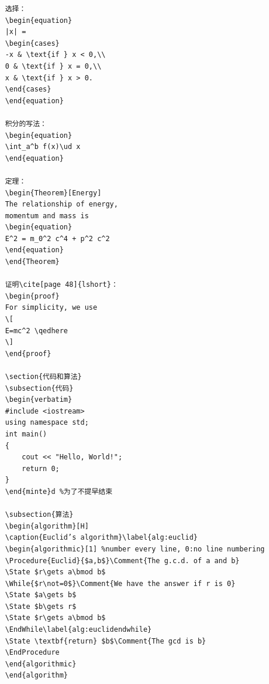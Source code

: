 \documentclass[a4paper]{article} %
\numberwithin{equation}{section} %
\newcommand{\ud}{\,\mathrm{d}}
\newtheorem{Theorem}{定理}
\begin{document}
\begin{verbatim}
    选择：
    \begin{equation}
    |x| =
    \begin{cases}
    -x & \text{if } x < 0,\\
    0 & \text{if } x = 0,\\
    x & \text{if } x > 0.
    \end{cases}
    \end{equation}
    
    积分的写法：
    \begin{equation}
    \int_a^b f(x)\ud x
    \end{equation}
    
    定理：
    \begin{Theorem}[Energy]
    The relationship of energy,
    momentum and mass is
    \begin{equation}
    E^2 = m_0^2 c^4 + p^2 c^2
    \end{equation}
    \end{Theorem}
    
    证明\cite[page 48]{lshort}：
    \begin{proof}
    For simplicity, we use
    \[
    E=mc^2 \qedhere
    \]
    \end{proof}
    
    \section{代码和算法}
    \subsection{代码}
    \begin{verbatim}
    #include <iostream>
    using namespace std;
    int main() 
    {
        cout << "Hello, World!";
        return 0;
    }
    \end{minte}d %为了不提早结束
    
    \subsection{算法}
    \begin{algorithm}[H]
    \caption{Euclid’s algorithm}\label{alg:euclid}
    \begin{algorithmic}[1] %number every line, 0:no line numbering
    \Procedure{Euclid}{$a,b$}\Comment{The g.c.d. of a and b}
    \State $r\gets a\bmod b$
    \While{$r\not=0$}\Comment{We have the answer if r is 0}
    \State $a\gets b$
    \State $b\gets r$
    \State $r\gets a\bmod b$
    \EndWhile\label{alg:euclidendwhile}
    \State \textbf{return} $b$\Comment{The gcd is b}
    \EndProcedure
    \end{algorithmic}
    \end{algorithm}
    

\end{verbatim}
\end{document}
